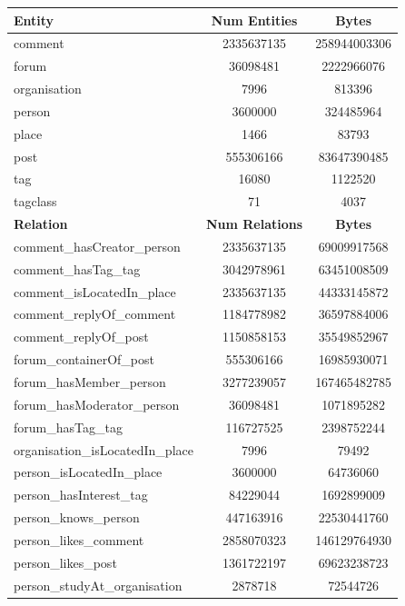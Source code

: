 \begin{table}[H]
\centering
\begin{tabular} {| l | c | c |}
\hline
\textbf{Entity} & \textbf{Num Entities} & \textbf{Bytes} \\
\hline \hline
comment & 2335637135 & 258944003306 \\
\hline
forum & 36098481 & 2222966076 \\
\hline
organisation & 7996 & 813396 \\
\hline
person & 3600000 & 324485964 \\
\hline
place & 1466 & 83793 \\
\hline
post & 555306166 & 83647390485 \\
\hline
tag & 16080 & 1122520 \\
\hline
tagclass & 71 & 4037 \\
\hline \hline
\textbf{Relation} & \textbf{Num Relations} & \textbf{Bytes} \\
\hline \hline
comment\_hasCreator\_person & 2335637135 & 69009917568 \\
\hline
comment\_hasTag\_tag & 3042978961 & 63451008509 \\
\hline
comment\_isLocatedIn\_place & 2335637135 & 44333145872 \\
\hline
comment\_replyOf\_comment & 1184778982 & 36597884006 \\
\hline
comment\_replyOf\_post & 1150858153 & 35549852967 \\
\hline
forum\_containerOf\_post & 555306166 & 16985930071 \\
\hline
forum\_hasMember\_person & 3277239057 & 167465482785 \\
\hline
forum\_hasModerator\_person & 36098481 & 1071895282 \\
\hline
forum\_hasTag\_tag & 116727525 & 2398752244 \\
\hline
organisation\_isLocatedIn\_place & 7996 & 79492 \\
\hline
person\_isLocatedIn\_place & 3600000 & 64736060 \\
\hline
person\_hasInterest\_tag & 84229044 & 1692899009 \\
\hline
person\_knows\_person & 447163916 & 22530441760 \\
\hline
person\_likes\_comment & 2858070323 & 146129764930 \\
\hline
person\_likes\_post & 1361722197 & 69623238723 \\
\hline
person\_studyAt\_organisation & 2878718 & 72544726 \\

\end{tabular}
\end{table}
